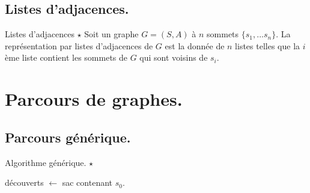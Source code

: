 \documentclass[french, 11pt]{article}
\begin{document}
\subsection{Listes d'adjacences.}

\begin{defi}{Listes d'adjacences $\star$}{}
    Soit un graphe $G=(S,A)$ à $n$ sommets $\{s_1,...s_n\}$. La représentation par listes d'adjacences de $G$ est la donnée de $n$ listes telles que la $i$ème liste contient les sommets de $G$ qui sont voisins de $s_i$.
\end{defi}

\vspace*{-1cm}

\section{Parcours de graphes.}

\vspace*{-0.3cm}

\subsection{Parcours générique.}

\begin{defi}{Algorithme générique. $\star$}{}
    \hspace*{0.28cm}\begin{algorithm}[H]
        \LinesNumbered
        \caption{Parcours générique.}
        découverts $\gets$ sac contenant $s_0$.\\
    \end{algorithm}
\end{defi}
\end{document}
